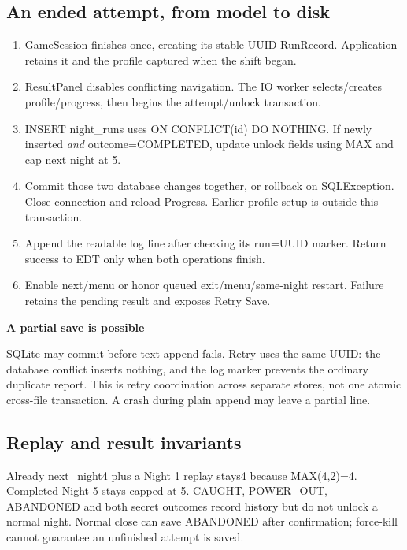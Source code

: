 \documentclass[11pt,a4paper]{article}
\newcommand{\note}[2]{\begin{tcolorbox}[enhanced,colback=Pale,colframe=Line,boxrule=0.4pt,arc=1mm,left=7pt,right=7pt,top=5pt,bottom=5pt]\textbf{#1}\par#2\end{tcolorbox}}
\begin{document}
\subsection*{An ended attempt, from model to disk}
\begin{enumerate}
\item GameSession finishes once, creating its stable UUID RunRecord. Application retains it and the profile captured when the shift began.
\item ResultPanel disables conflicting navigation. The IO worker selects/creates profile/progress, then begins the attempt/unlock transaction.
\item INSERT night\_runs uses ON CONFLICT(id) DO NOTHING. If newly inserted \emph{and} outcome=COMPLETED, update unlock fields using MAX and cap next night at 5.
\item Commit those two database changes together, or rollback on SQLException. Close connection and reload Progress. Earlier profile setup is outside this transaction.
\item Append the readable log line after checking its run=UUID marker. Return success to EDT only when both operations finish.
\item Enable next/menu or honor queued exit/menu/same-night restart. Failure retains the pending result and exposes Retry Save.
\end{enumerate}
\note{A partial save is possible}{SQLite may commit before text append fails. Retry uses the same UUID: the database conflict inserts nothing, and the log marker prevents the ordinary duplicate report. This is retry coordination across separate stores, not one atomic cross-file transaction. A crash during plain append may leave a partial line.}
\subsection*{Replay and result invariants}
Already next\_night4 plus a Night 1 replay stays4 because MAX(4,2)=4. Completed Night 5 stays capped at 5. CAUGHT, POWER\_OUT, ABANDONED and both secret outcomes record history but do not unlock a normal night. Normal close can save ABANDONED after confirmation; force-kill cannot guarantee an unfinished attempt is saved.
\end{document}
